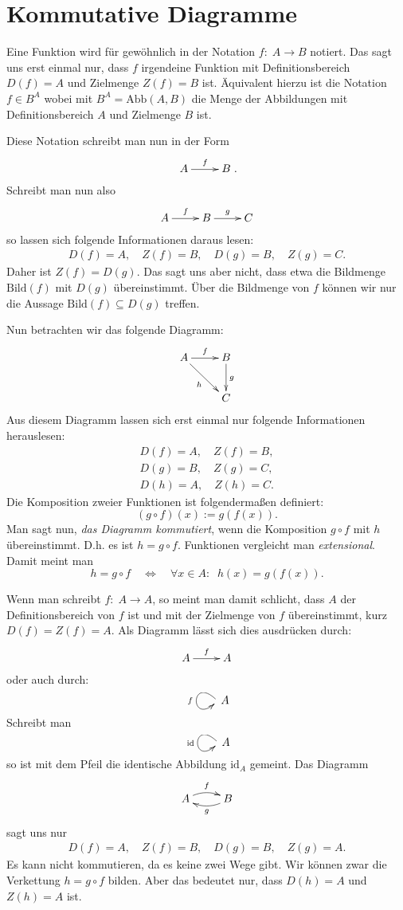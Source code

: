 \documentclass[a4paper,12pt,fleqn]{article}
\begin{document}
\section*{Kommutative Diagramme}

Eine Funktion wird für gewöhnlich in der Notation
\(f{:}\;A\rightarrow B\) notiert. Das sagt uns erst einmal nur,
dass \(f\) irgendeine Funktion mit Definitionsbereich
\(D(f)=A\) und Zielmenge \(Z(f)=B\) ist. Äquivalent hierzu ist
die Notation \(f{\in}B^A\) wobei mit
\(B^A=\mathrm{Abb}(A,B)\) die Menge der Abbildungen mit
Definitionsbereich \(A\) und Zielmenge \(B\) ist.

Diese Notation schreibt man nun in der Form
\[\xymatrix{A \ar[r]^f & B}.\]
Schreibt man nun also
\[\xymatrix{A \ar[r]^f & B \ar[r]^g & C}\]
so lassen sich folgende Informationen daraus lesen:
\begin{gather*}
D(f)=A,\quad Z(f)=B,\quad D(g)=B,\quad Z(g)=C.
\end{gather*}
Daher ist \(Z(f)=D(g)\). Das sagt uns aber nicht, dass etwa die
Bildmenge \(\mathrm{Bild}(f)\) mit \(D(g)\) übereinstimmt.
Über die Bildmenge von \(f\) können wir nur die Aussage
\(\mathrm{Bild}(f)\subseteq D(g)\) treffen.

Nun betrachten wir das folgende Diagramm:
\[\xymatrix{A \ar[r]^f \ar[dr]_h & B\ar[d]^g\\
& C}
\]
Aus diesem Diagramm lassen sich erst einmal nur folgende
Informationen herauslesen:
\begin{gather*}
D(f)=A,\quad Z(f)=B,\\
D(g)=B,\quad Z(g)=C,\\
D(h)=A,\quad Z(h)=C.
\end{gather*}
Die Komposition zweier Funktionen ist folgendermaßen definiert:
\[(g\circ f)(x):=g(f(x)).\]
Man sagt nun, \textit{das Diagramm kommutiert}, wenn die Komposition
\(g\circ f\) mit \(h\) übereinstimmt. D.h. es ist \(h=g\circ f\).
Funktionen vergleicht man \textit{extensional}. Damit meint man
\[h=g\circ f \quad\Longleftrightarrow\quad \forall x{\in}A{:}\;\;
h(x)=g(f(x)).\]

Wenn man schreibt \(f{:}\; A\rightarrow A\), so meint man damit
schlicht, dass \(A\) der Definitionsbereich von \(f\) ist und
mit der Zielmenge von \(f\) übereinstimmt, kurz \(D(f)=Z(f)=A\). Als Diagramm lässt sich
dies ausdrücken durch:
\[\xymatrix{A\ar[r]^f & A}\]
oder auch durch:
\[\xymatrix{\ar@(ul,dl)_f}A\]
Schreibt man
\[\xymatrix{\ar@(ul,dl)_{\mathrm{id}}}A\]
so ist mit dem Pfeil die identische Abbildung \(\mathrm{id}_A\)
gemeint. Das Diagramm
\[\xymatrix{A \ar@/^/[r]^f & \ar@/^/[l]^g B}\]
sagt uns nur
\begin{gather*}
D(f)=A,\quad Z(f)=B,\quad D(g)=B,\quad Z(g)=A.
\end{gather*}
Es kann nicht kommutieren, da es keine zwei Wege gibt.
Wir können zwar die Verkettung \(h=g\circ f\) bilden. Aber das
bedeutet nur, dass \(D(h)=A\) und \(Z(h)=A\) ist.
\end{document}
